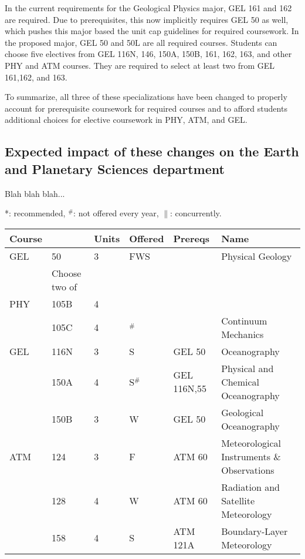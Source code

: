 \documentclass[12pt]{article}
\begin{document}
In the current requirements for the Geological Physics major, GEL 161
and 162 are required.  Due to prerequisites, this now implicitly
requires GEL 50 as well, which pushes this major based the unit cap
guidelines for required coursework.  In the proposed major, GEL 50 and
50L are all required courses.  Students can choose five electives from
GEL 116N, 146, 150A, 150B, 161, 162, 163, and other PHY and ATM
courses.  They are required to select at least two from GEL 161,162,
and 163.

To summarize, all three of these specializations have been changed to
properly account for prerequisite coursework for required courses and
to afford students additional choices for elective coursework in PHY,
ATM, and GEL.

\subsection{Expected impact of these changes on the Earth and Planetary Sciences department}

Blah blah blah...

\newpage

\vskip 0.25cm
\noindent
*: recommended, $^\#$: not offered every year, $\parallel$: concurrently.\\
\begin{tabular}{|llllll|}
\hline
Course & & Units & Offered & Prereqs & Name \\
\hline
GEL & 50     & 3 & FWS & & Physical Geology \\
\hline
\hline
    & Choose two of & & & & \\
\hline
PHY  & 105B   & 4 & & & \\
     & 105C   & 4 & $^\#$  &             & Continuum Mechanics\\
GEL  & 116N   & 3 & S  & GEL 50      & Oceanography\\
     & 150A   & 4 & S$^\#$ & GEL 116N,55 & Physical and Chemical Oceanography\\
     & 150B   & 3 & W  & GEL 50      & Geological Oceanography\\
ATM  & 124    & 3 & F  & ATM 60      & Meteorological Instruments \& Observations \\
     & 128    & 4 & W  & ATM 60      & Radiation and Satellite Meteorology \\
     & 158    & 4 & S  & ATM 121A    & Boundary-Layer Meteorology \\
\hline
\end{tabular}\\
\end{document}

